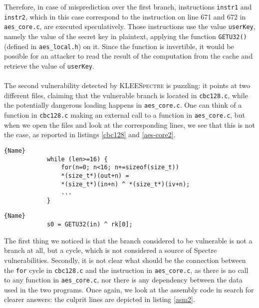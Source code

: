 \documentclass[target=mst,aauheader=aics]{thud}
\theoremstyle{definition}
\begin{document}
	Therefore, in case of misprediction over the first branch, instructions \texttt{instr1} and \texttt{instr2}, which in this case correspond to the instruction on line 671 and 672 in \texttt{aes\_core.c}, are executed speculatively. Those instructions use the value \texttt{userKey}, namely the value of the secret key in plaintext, applying the function \texttt{GETU32()} (defined in \texttt{aes\_local.h}) on it. Since the function is invertible, it would be possible for an attacker to read the result of the computation from the cache and retrieve the value of \texttt{userKey}.
	\paragraph{}The second vulnerability detected by \textsc{KLEESpectre} is puzzling: it points at two different files, claiming that the vulnerable branch is located in \texttt{cbc128.c}, while the potentially dangerous loading happens in \texttt{aes\_core.c}. One can think of a function in \texttt{cbc128.c} making an external call to a function in \texttt{aes\_core.c}, but when we open the files and look at the corresponding lines, we see that this is not the case, as reported in listings \ref{cbc128} and \ref{aes-core2}.
	
	\lstset{
		numbers=left
	}
	\begin{minipage}{.7\textwidth}
		\begin{lstlisting}[caption=\texttt{cbc128.c}, firstnumber=92, label=cbc128]{Name}
			while (len>=16) {
				for(n=0; n<16; n+=sizeof(size_t))
				*(size_t*)(out+n) = 
				*(size_t*)(in+n) ^ *(size_t*)(iv+n);
				...
			}
		\end{lstlisting}
	\end{minipage}
	
	\begin{minipage}{.5\textwidth}
		\begin{lstlisting}[caption=\texttt{aes\_core.c}, firstnumber=797, label=aes-core2]{Name}
			s0 = GETU32(in) ^ rk[0];
		\end{lstlisting}
	\end{minipage}
	\vspace{3mm}
	
	The first thing we noticed is that the branch considered to be vulnerable is not a branch at all, but a cycle, which is not considered a source of Spectre vulnerabilities. Secondly, it is not clear what should be the connection between the \texttt{for} cycle in \texttt{cbc128.c} and the instruction in \texttt{aes\_core.c}, as there is no call to any function in \texttt{aes\_core.c}, nor there is any dependency between the data used in the two programs. Once again, we look at the assembly code in search for clearer answers: the culprit lines are depicted in listing \ref{asm2}.
	
\end{document}
